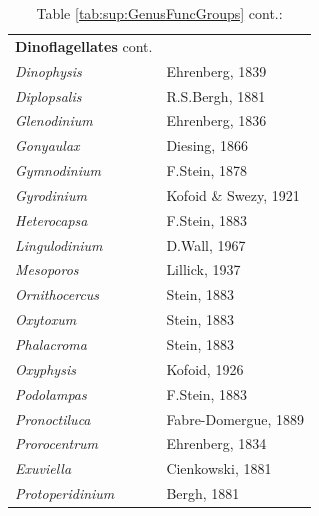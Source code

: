 \documentclass[draft]{agujournal2019}
\begin{document}
\begin{table}

\caption{Table \ref{tab:sup:GenusFuncGroups} cont.:}
\begin{tabular}{@{}ll@{}}
\textbf{Dinoflagellates} cont.    &                                                            \\
\textit{Dinophysis}        & Ehrenberg, 1839                                            \\
\textit{Diplopsalis}       & R.S.Bergh, 1881                                            \\
\textit{Glenodinium}       & Ehrenberg, 1836     
\\
\textit{Gonyaulax}         & Diesing, 1866                                              \\
\textit{Gymnodinium}       & F.Stein, 1878                                              \\
\textit{Gyrodinium}        & Kofoid \& Swezy, 1921                                      \\
\textit{Heterocapsa}       & F.Stein, 1883                                              \\
\textit{Lingulodinium}     & D.Wall, 1967                                               \\
\textit{Mesoporos}         & Lillick, 1937                                              \\
\textit{Ornithocercus}     & Stein, 1883                                                \\
\textit{Oxytoxum}          & Stein, 1883                                                \\
\textit{Phalacroma}        & Stein, 1883                                                \\
\textit{Oxyphysis}         & Kofoid, 1926                                               \\
\textit{Podolampas}        & F.Stein, 1883                                              \\
\textit{Pronoctiluca}      & Fabre-Domergue, 1889                                       \\
\textit{Prorocentrum}      & Ehrenberg, 1834                                            \\
\textit{Exuviella}         & Cienkowski, 1881                                           \\
\textit{Protoperidinium}   & Bergh, 1881                                                \\

\end{tabular}
\end{table}
\end{document}
